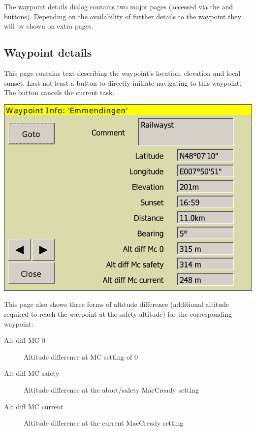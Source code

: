 \documentclass[a4paper,12pt]{refrep}
\begin{document}
The waypoint details dialog contains two major pages (accessed via the
\button{$>$} and \button{$<$} buttons). Depending on the availability of further
details to the waypoint they will by shown on extra pages.

\subsection*{Waypoint details}
This page contains text describing the waypoint's location, elevation
and local sunset. Last not least a button  to directly initiate
navigating to this waypoint. The button cancels the current task. 
\begin{center}
\includegraphics[angle=0,width=\linewidth,keepaspectratio='true']{figures/dialog-waypointdetails0.png}
\end{center}

This page also shows three forms of altitude difference (additional
altitude required to reach the waypoint at the safety altitude) for
the corresponding waypoint:
\begin{description}
\item[Alt diff MC 0] Altitude difference at MC setting of 0
\item[Alt diff MC safety] Altitude difference at the abort/safety MacCready setting
\item[Alt diff MC current] Altitude difference at the current MacCready setting
\end{description}
\end{document}

